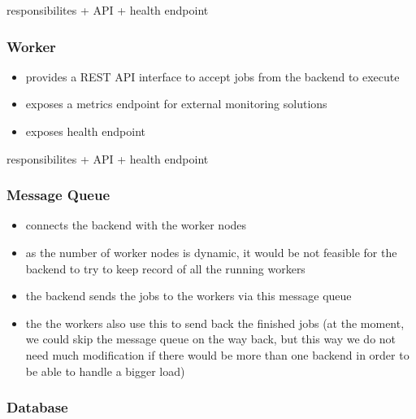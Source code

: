 responsibilites + API + health endpoint

\subsubsection{Worker}

\begin{itemize}
	\item provides a REST API interface to accept jobs from the backend to execute
	\item exposes a metrics endpoint for external monitoring solutions
	\item exposes health endpoint
\end{itemize}

responsibilites + API + health endpoint

\subsubsection{Message Queue}

\begin{itemize}
	\item connects the backend with the worker nodes
	\item as the number of worker nodes is dynamic, it would be not feasible for the backend to try to keep record of all the running workers
	\item the backend sends the jobs to the workers via this message queue
	\item the the workers also use this to send back the finished jobs (at the moment, we could skip the message queue on the way back, but this way we do not need much modification if there would be more than one backend in order to \eg be able to handle a bigger load)
\end{itemize}

\subsubsection{Database}

